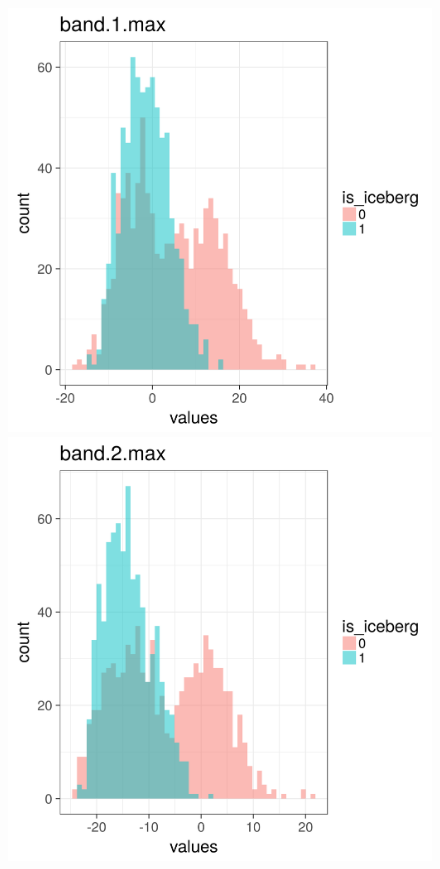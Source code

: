 \documentclass[fleqn,10pt]{SelfArx} %
\begin{document}
\begin{figure}[ht]
	\centering
	\begin{minipage}{0.24\textwidth}
		\includegraphics[scale=0.2]{iceberg/analysis/band_1_max.png}
	\end{minipage}%
	\begin{minipage}{0.24\textwidth}
		\includegraphics[scale=0.2]{iceberg/analysis/band_2_max.png}

\end{minipage}
\end{figure}
\end{document}
